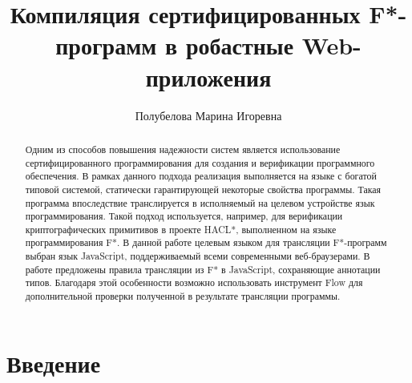 \title{Компиляция сертифицированных F*-программ в робастные Web-приложения}


\author{Полубелова Марина Игоревна}



\maketitle

\begin{abstract}
Одним из способов повышения надежности систем является использование
сертифицированного программирования для создания и верификации программного
обеспечения. В рамках данного подхода реализация выполняется на языке с богатой
типовой системой, статически гарантирующей некоторые свойства программы. Такая
программа впоследствие транслируется в исполняемый на целевом устройстве язык
программирования. Такой подход используется, например, для верификации
криптографических примитивов в проекте HACL*, выполненном на языке
программирования F*. В данной работе целевым языком для трансляции F*-программ
выбран язык JavaScript, поддерживаемый всеми современными веб-браузерами. В
работе предложены правила трансляции из F* в JavaScript, сохраняющие аннотации
типов. Благодаря этой особенности возможно использовать инструмент Flow для
дополнительной проверки полученной в результате трансляции программы.
\end{abstract}




 

\section*{Введение}

